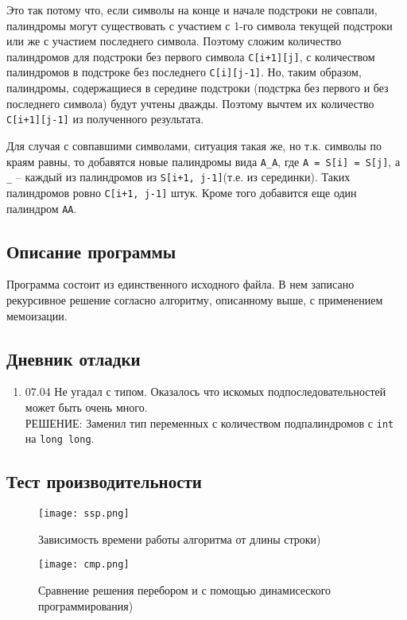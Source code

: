 \documentclass[12pt]{article}
\begin{document}
Это так потому что, если символы на конце и начале подстроки не совпали, палиндромы могут существовать с участием с 1-го символа текущей подстроки или же с участием последнего символа. Поэтому сложим количество палиндромов для подстроки без первого символа \verb|C[i+1][j]|, с количеством палиндромов в подстроке без последнего \verb|C[i][j-1]|. Но, таким образом, палиндромы, содержащиеся в середине подстроки (подстрка без первого и без последнего символа) будут учтены дважды. Поэтому вычтем их количество \verb|C[i+1][j-1]| из полученного результата.

Для случая с совпавшими символами, ситуация такая же, но т.к. символы по краям равны, то добавятся новые палиндромы вида \verb|A_A|, где \verb|A = S[i] = S[j]|, а \verb|_| -- каждый из палиндромов из \verb|S[i+1, j-1]|(т.е. из серединки). Таких палиндромов ровно \verb|C[i+1, j-1]| штук. Кроме того добавится еще один палиндром \verb|AA|.

\subsection*{Описание программы}

Программа состоит из единственного исходного файла. В нем записано рекурсивное решение согласно алгоритму, описанному выше, с применением мемоизации.

\subsection*{Дневник отладки}
\begin{enumerate}
    \item 07.04 Не угадал с типом. Оказалось что искомых подпоследовательностей может быть очень много. \\
    РЕШЕНИЕ: Заменил тип переменных с количеством подпалиндромов с \verb|int| на \verb|long long|.

\end{enumerate}
\subsection*{Тест производительности}

\begin{figure}[H]
  \caption{Зависимость времени работы алгоритма от длины строки)}
  \centering
       \texttt{[image: ssp.png]}
\end{figure}


\begin{figure}[H]
  \caption{Сравнение решения перебором и с помощью динамисеского программирования)}
  \centering
       \texttt{[image: cmp.png]}
\end{figure}
\end{document}
